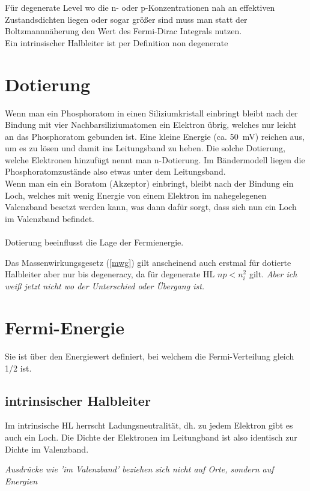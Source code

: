 \documentclass[paper=a4,10pt]{scrartcl}
\begin{document}
Für degenerate Level wo die n- oder p-Konzentrationen nah an effektiven Zustandsdichten liegen oder sogar größer sind muss man statt der Boltzmannnäherung den Wert des Fermi-Dirac Integrals nutzen. \\

Ein intrinsischer Halbleiter ist per Definition non degenerate
\section{Dotierung}
Wenn man ein Phosphoratom in einen Siliziumkristall einbringt bleibt nach der Bindung mit vier Nachbarsiliziumatomen ein Elektron übrig, welches nur leicht an das Phosphoratom gebunden ist. Eine kleine Energie (ca. \SI{50}{\milli\volt}) reichen aus, um es zu lösen und damit ins Leitungsband zu heben. Die solche Dotierung, welche Elektronen hinzufügt nennt man n-Dotierung. Im Bändermodell liegen die Phosphoratomzustände also etwas unter dem Leitungsband.\\
Wenn man ein ein Boratom (Akzeptor) einbringt, bleibt nach der Bindung ein Loch, welches mit wenig Energie von einem Elektron im nahegelegenen Valenzband besetzt werden kann, was dann dafür sorgt, dass sich nun ein Loch im Valenzband befindet.\\\\
Dotierung beeinflusst die Lage der Fermienergie.

Das Massenwirkungsgesetz (\ref{mwg}) gilt anscheinend auch erstmal für dotierte Halbleiter aber nur bis degeneracy, da für degenerate HL $np < n_i^2$ gilt. 
\textit{Aber ich weiß jetzt nicht wo der Unterschied oder Übergang ist.}

\section{Fermi-Energie}
Sie ist über den Energiewert definiert, bei welchem die Fermi-Verteilung gleich 1/2 ist.

\subsection{intrinsischer Halbleiter}
Im intrinsische HL herrscht Ladungsneutralität, dh. zu jedem Elektron gibt es auch ein Loch. Die Dichte der Elektronen im Leitungband ist also identisch zur Dichte im Valenzband.

\textit{Ausdrücke wie 'im Valenzband' beziehen sich nicht auf Orte, sondern auf Energien}
\end{document}
